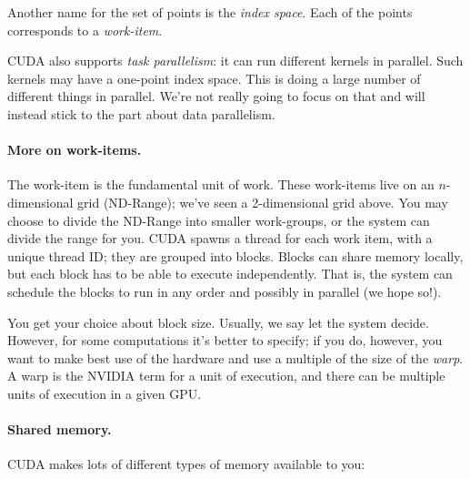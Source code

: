 \documentclass[a4paper]{report}
\begin{document}
\begin{center}
\end{center}

Another name for the set of points is the \emph{index space}. 
Each of the points corresponds to a \emph{work-item}.

CUDA also supports \emph{task parallelism}: it can run different
kernels in parallel. Such kernels may have a one-point index space. This is
doing a large number of different things in parallel. We're not really going
to focus on that and will instead stick to the part about data parallelism.

\paragraph{More on work-items.} The work-item is the fundamental
unit of work. These work-items live on an $n$-dimensional
grid (ND-Range); we've seen a 2-dimensional grid above. You may choose
to divide the ND-Range into smaller work-groups, or the system can
divide the range for you. CUDA spawns a thread for each work item,
with a unique thread ID; they are grouped into blocks. Blocks can share 
memory locally, but each block has to be able to execute independently.
That is, the system can schedule the blocks to run in any order and possibly
in parallel (we hope so!). 

You get your choice about block size. Usually, we say let the system decide. However, for some computations it's better to specify; if you do, however, you want to make best use of the hardware and use a multiple of the size of the \textit{warp}. A warp is the NVIDIA term for a unit of execution, and there can be multiple units of execution in a given GPU.

\paragraph{Shared memory.} CUDA makes lots of different types of
memory available to you:
\end{document}
